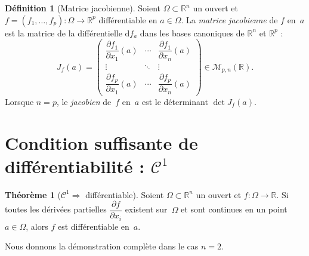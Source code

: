 \documentclass[12pt,a4paper,openany]{book}
\theoremstyle{definition}
\newtheorem{definition}{Définition}[chapter]
\newtheorem{theoreme}{Théorème}[chapter]
\newcommand{\R}{\mathbb{R}}
\newcommand{\dd}{\mathrm{d}}
\begin{document}
\begin{definition}[Matrice jacobienne]\label{def:jacobienne}
  Soient $\Omega \subset \R^n$ un ouvert et $f = (f_1, \ldots, f_p) \colon \Omega \to \R^p$ différentiable en $a \in \Omega$. La \emph{matrice jacobienne} de $f$ en~$a$ est la matrice de la différentielle $\dd f_a$ dans les bases canoniques de $\R^n$ et $\R^p$ :
  \[
    J_f(a) = \begin{pmatrix}
      \dfrac{\partial f_1}{\partial x_1}(a) & \cdots & \dfrac{\partial f_1}{\partial x_n}(a) \\[8pt]
      \vdots & \ddots & \vdots \\[4pt]
      \dfrac{\partial f_p}{\partial x_1}(a) & \cdots & \dfrac{\partial f_p}{\partial x_n}(a)
    \end{pmatrix}
    \in \mathcal{M}_{p,n}(\R).
  \]
  Lorsque $n = p$, le \emph{jacobien} de~$f$ en~$a$ est le déterminant $\det J_f(a)$.
\end{definition}

\section{Condition suffisante de différentiabilité : \texorpdfstring{$\mathcal{C}^1$}{C1}}
\label{sec:C1-differentiable}

\begin{theoreme}[$\mathcal{C}^1 \Rightarrow$ différentiable]
  \label{thm:C1-diff}
  Soient $\Omega \subset \R^n$ un ouvert et $f \colon \Omega \to \R$. Si toutes les dérivées partielles $\dfrac{\partial f}{\partial x_i}$ existent sur~$\Omega$ et sont continues en un point $a \in \Omega$, alors $f$ est différentiable en~$a$.
\end{theoreme}

Nous donnons la démonstration complète dans le cas $n = 2$.
\end{document}
